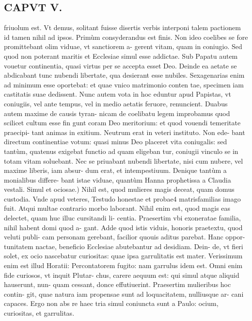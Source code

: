 \documentclass{article}
\begin{document}
\begin{pages}
\section*{CAPVT V. }
\marginpar{[ p.63 ]}\pstart friuolum est. Vt demus, solitant fuisse disertis verbis interponi talem pactionem id tamen nihil ad ipsos. Primùm consyderandus est finis. Non ideo coelibes se fore promittebant olim viduae, vt sanctiorem a- gerent vitam, quam in coniugio. Sed quod non poterant maritis et Ecclesiae simul esse addictae. Sub Papatu autem vouetur continentia, quasi virtus per se accepta esset Deo. Deinde ea aetate se abdicabant tunc nubendi libertate, qua desierant esse nubiles. Sexagenarias enim ad minimum esse oportebat: et quae vnico matrimonio conten tae, specimen iam castitatis suae dedissent. Nunc autem vota in hoc eduntur apud Papistas, vt coniugiis, vel ante tempus, vel in medio aetatis feruore, renuncient. Duabus autem maxime de causis tyran- nicam de coelibatu legem improbamus quod scilicet cultum esse fin gunt coram Deo meritorium: et quod vouendi temeritate praecipi- tant animas in exitium. Neutrum erat in veteri instituto. Non ede- bant directum continentiae votum: quasi minus Deo placeret vita coniugalis: sed tantùm, quatenus exigebat functio ad quam eligeban tur, coniugii vinculo se in totam vitam soluebant. Nec se priuabant nubendi libertate, nisi cum nubere, vel maxime liberis, iam absur- dum erat, et intempestiuum. Denique tantùm a monialibus differe- bant istae viduae, quantùm Hanna prophetissa a Claudia vestali.  \pend\pstart Simul et ociosae.) Nihil est, quod mulieres magis deceat, quam domus custodia. Vnde apud veteres, Testudo honestae et probae4 matrisfamilias imago fuit. Atqui multae contrario morbo laborant. Nihil enim est, quod magis eas delectet, quam huc illuc cursitandi li- centia. Praesertim vbi exoneratae familia, nihil habent domi quod a- gant. Adde quod istis viduis, honoris praetextu, quod veluti publi- cam personam gerebant, facilior quouis aditus parebat. Hanc oppor- tunitatem nactae, beneficio Ecclesiae abutebantur ad desidiam. Dein- de, vt fieri solet, ex ocio nascebatur curiositas: quae ipsa garrulitatis est mater. Verissimum enim est illud Horatii: Percontatorem fugito: nam garrulus idem est. Omni enim fide curiosos, vt inquit Plutar- chus, carere aequum est: qui simul atque aliquid hauserunt, nun- quam cessant, donce effutiuerint. Praesertim mulieribus hoc contin- git, quae natura iam propensae sunt ad loquacitatem, nulliusque ar- cani capaces. Ergo non abs re haec tria simul coniuncta sunt a Paulo: ocium, curiositas, et garrulitas.  \pend
{}
{}

\end{pages}
\end{document}
